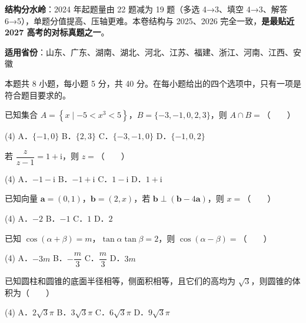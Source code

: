 

\begin{gknotice}
\textbf{结构分水岭}：2024 年起题量由 22 题减为 19 题（多选 4→3、填空 4→3、解答 6→5），单题分值提高、压轴更难。本卷结构与 2025、2026 完全一致，\textbf{是最贴近 2027 高考的对标真题之一}。

\textbf{适用省份}：山东、广东、湖南、湖北、河北、江苏、福建、浙江、河南、江西、安徽
\end{gknotice}

\par\medskip


\begin{gktip}
本题共 8 小题，每小题 5 分，共 40 分。在每小题给出的四个选项中，只有一项是符合题目要求的。
\end{gktip}

已知集合 $A=\left\{x\mid -5<x^{3}<5\right\}$，$B=\{-3,-1,0,2,3\}$，则 $A\cap B=$（　　）

\begin{gkopts}(4)
\task A．$\{-1,0\}$
\task B．$\{2,3\}$
\task C．$\{-3,-1,0\}$
\task D．$\{-1,0,2\}$
\end{gkopts}

若 $\dfrac{z}{z-1}=1+\mathrm{i}$，则 $z=$（　　）

\begin{gkopts}(4)
\task A．$-1-\mathrm{i}$
\task B．$-1+\mathrm{i}$
\task C．$1-\mathrm{i}$
\task D．$1+\mathrm{i}$
\end{gkopts}

已知向量 $\boldsymbol a=(0,1)$，$\boldsymbol b=(2,x)$，若 $\boldsymbol b\perp(\boldsymbol b-4\boldsymbol a)$，则 $x=$（　　）

\begin{gkopts}(4)
\task A．$-2$
\task B．$-1$
\task C．$1$
\task D．$2$
\end{gkopts}

已知 $\cos(\alpha+\beta)=m$，$\tan\alpha\tan\beta=2$，则 $\cos(\alpha-\beta)=$（　　）

\begin{gkopts}(4)
\task A．$-3m$
\task B．$-\dfrac m3$
\task C．$\dfrac m3$
\task D．$3m$
\end{gkopts}

已知圆柱和圆锥的底面半径相等，侧面积相等，且它们的高均为 $\sqrt3$，则圆锥的体积为（　　）

\begin{gkopts}(4)
\task A．$2\sqrt3\pi$
\task B．$3\sqrt3\pi$
\task C．$6\sqrt3\pi$
\task D．$9\sqrt3\pi$
\end{gkopts}

